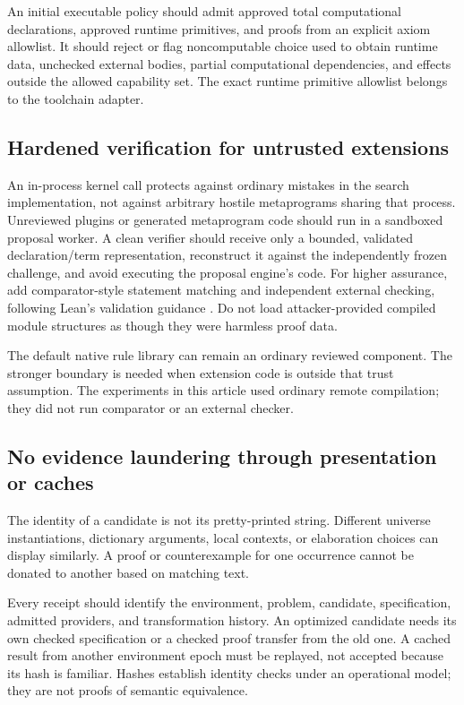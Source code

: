 An initial executable policy should admit approved total computational declarations, approved runtime primitives, and proofs from an explicit axiom allowlist. It should reject or flag noncomputable choice used to obtain runtime data, unchecked external bodies, partial computational dependencies, and effects outside the allowed capability set. The exact runtime primitive allowlist belongs to the toolchain adapter.

\subsection{Hardened verification for untrusted extensions}

An in-process kernel call protects against ordinary mistakes in the search implementation, not against arbitrary hostile metaprograms sharing that process. Unreviewed plugins or generated metaprogram code should run in a sandboxed proposal worker. A clean verifier should receive only a bounded, validated declaration/term representation, reconstruct it against the independently frozen challenge, and avoid executing the proposal engine's code. For higher assurance, add comparator-style statement matching and independent external checking, following Lean's validation guidance \cite{lean-validation}. Do not load attacker-provided compiled module structures as though they were harmless proof data.

The default native rule library can remain an ordinary reviewed component. The stronger boundary is needed when extension code is outside that trust assumption. The experiments in this article used ordinary remote compilation; they did not run comparator or an external checker.

\subsection{No evidence laundering through presentation or caches}

The identity of a candidate is not its pretty-printed string. Different universe instantiations, dictionary arguments, local contexts, or elaboration choices can display similarly. A proof or counterexample for one occurrence cannot be donated to another based on matching text.

Every receipt should identify the environment, problem, candidate, specification, admitted providers, and transformation history. An optimized candidate needs its own checked specification or a checked proof transfer from the old one. A cached result from another environment epoch must be replayed, not accepted because its hash is familiar. Hashes establish identity checks under an operational model; they are not proofs of semantic equivalence.

